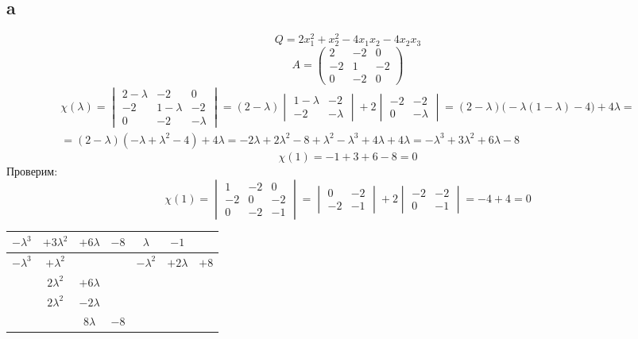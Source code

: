 \subsection{a}

$$ Q = 2x_1^2 + x_2^2 - 4x_1x_2 - 4x_2x_3 $$
$$ A =
\begin{pmatrix}
	2 & -2 & 0 \\
    -2 & 1 & -2 \\
    0 & -2 & 0
\end{pmatrix} $$
\begin{multline*}
    \chi(\lambda) =
    \begin{vmatrix}
        2 - \lambda & -2 & 0 \\
        -2 & 1 - \lambda & -2 \\
        0 & -2 & -\lambda
    \end{vmatrix} = (2 - \lambda)
    \begin{vmatrix}
        1 - \lambda & -2 \\
        -2 & -\lambda
    \end{vmatrix} + 2
    \begin{vmatrix}
        -2 & -2 \\
        0 & -\lambda
    \end{vmatrix} = (2 - \lambda) \bigg( -\lambda(1 - \lambda) - 4 \bigg) + 4\lambda = \\
    = (2 - \lambda)(-\lambda + \lambda^2 - 4) + 4\lambda = -2\lambda + 2\lambda^2 - 8 + \lambda^2 - \lambda^3 + 4\lambda + 4\lambda = -\lambda^3 + 3\lambda^2 + 6\lambda - 8
\end{multline*}
$$ \chi(1) = -1 + 3 + 6 - 8 = 0 $$
Проверим:
$$ \chi(1) =
\begin{vmatrix}
	1 & -2 & 0 \\
    -2 & 0 & -2 \\
    0 & -2 & -1
\end{vmatrix} =
\begin{vmatrix}
	0 & -2 \\
    -2 & -1
\end{vmatrix} + 2
\begin{vmatrix}
	-2 & -2 \\
    0 & -1
\end{vmatrix} = -4 + 4 = 0 $$
\begin{tabular}{c c c c | c c c}
    $ -\lambda^3 $ & $ +3\lambda^2 $ & $ +6\lambda $ & $ -8 $ & $ \lambda $ & $ -1 $ \\
    \hline
    $ -\lambda^3 $ & $ + \lambda^2 $ & & & $ -\lambda^2 $ & $ +2\lambda $ & $ + 8 $ \\
    \hline
    & $ 2\lambda^2 $ & $ + 6\lambda $ & \\
    & $ 2\lambda^2 $ & $ - 2\lambda $ & \\
    \hline
    & & $ 8\lambda $ & $ -8 $
\end{tabular}
